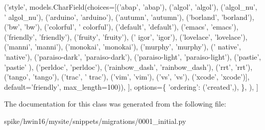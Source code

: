\begin{DoxyCode}
                (\textcolor{stringliteral}{'style'}, models.CharField(choices=[(\textcolor{stringliteral}{'abap'}, \textcolor{stringliteral}{'abap'}), (\textcolor{stringliteral}{'algol'}, \textcolor{stringliteral}{'algol'}), (\textcolor{stringliteral}{'algol\_nu'}, \textcolor{stringliteral}{'
      algol\_nu'}), (\textcolor{stringliteral}{'arduino'}, \textcolor{stringliteral}{'arduino'}), (\textcolor{stringliteral}{'autumn'}, \textcolor{stringliteral}{'autumn'}), (\textcolor{stringliteral}{'borland'}, \textcolor{stringliteral}{'borland'}), (\textcolor{stringliteral}{'bw'}, \textcolor{stringliteral}{'bw'}), (\textcolor{stringliteral}{'colorful'}, \textcolor{stringliteral}{'
      colorful'}), (\textcolor{stringliteral}{'default'}, \textcolor{stringliteral}{'default'}), (\textcolor{stringliteral}{'emacs'}, \textcolor{stringliteral}{'emacs'}), (\textcolor{stringliteral}{'friendly'}, \textcolor{stringliteral}{'friendly'}), (\textcolor{stringliteral}{'fruity'}, \textcolor{stringliteral}{'fruity'}), (\textcolor{stringliteral}{'
      igor'}, \textcolor{stringliteral}{'igor'}), (\textcolor{stringliteral}{'lovelace'}, \textcolor{stringliteral}{'lovelace'}), (\textcolor{stringliteral}{'manni'}, \textcolor{stringliteral}{'manni'}), (\textcolor{stringliteral}{'monokai'}, \textcolor{stringliteral}{'monokai'}), (\textcolor{stringliteral}{'murphy'}, \textcolor{stringliteral}{'murphy'}), (\textcolor{stringliteral}{'
      native'}, \textcolor{stringliteral}{'native'}), (\textcolor{stringliteral}{'paraiso-dark'}, \textcolor{stringliteral}{'paraiso-dark'}), (\textcolor{stringliteral}{'paraiso-light'}, \textcolor{stringliteral}{'paraiso-light'}), (\textcolor{stringliteral}{'pastie'}, \textcolor{stringliteral}{'pastie'}
      ), (\textcolor{stringliteral}{'perldoc'}, \textcolor{stringliteral}{'perldoc'}), (\textcolor{stringliteral}{'rainbow\_dash'}, \textcolor{stringliteral}{'rainbow\_dash'}), (\textcolor{stringliteral}{'rrt'}, \textcolor{stringliteral}{'rrt'}), (\textcolor{stringliteral}{'tango'}, \textcolor{stringliteral}{'tango'}), (\textcolor{stringliteral}{'trac'}, \textcolor{stringliteral}{'
      trac'}), (\textcolor{stringliteral}{'vim'}, \textcolor{stringliteral}{'vim'}), (\textcolor{stringliteral}{'vs'}, \textcolor{stringliteral}{'vs'}), (\textcolor{stringliteral}{'xcode'}, \textcolor{stringliteral}{'xcode'})], default=\textcolor{stringliteral}{'friendly'}, max\_length=100)),
            ],
            options=\{
                \textcolor{stringliteral}{'ordering'}: (\textcolor{stringliteral}{'created'},),
            \},
        ),
    ]
\end{DoxyCode}


The documentation for this class was generated from the following file\+:\begin{DoxyCompactItemize}
\item 
spike/hwin16/mysite/snippets/migrations/0001\+\_\+initial.\+py\end{DoxyCompactItemize}
